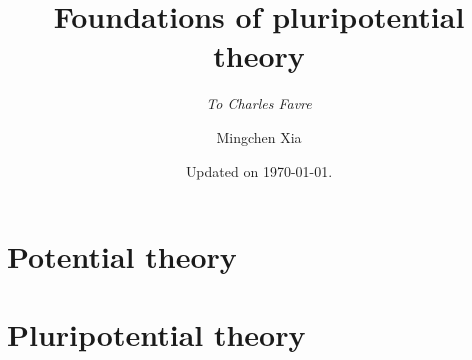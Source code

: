 \documentclass[envcountsect]{svmono}
\begin{document}
\author{Mingchen Xia}
\title{Foundations of pluripotential theory}
\subtitle{\large\itshape To Charles Favre}
\date{Updated on \today.}
\maketitle
\frontmatter


\tableofcontents

\mainmatter
\part{Potential theory}
\label{part:potential}







\part{Pluripotential theory}
\label{part:pluripotential}













\appendix
{}


\backmatter
\printindex

\begingroup
\raggedright

\endgroup
\end{document}
